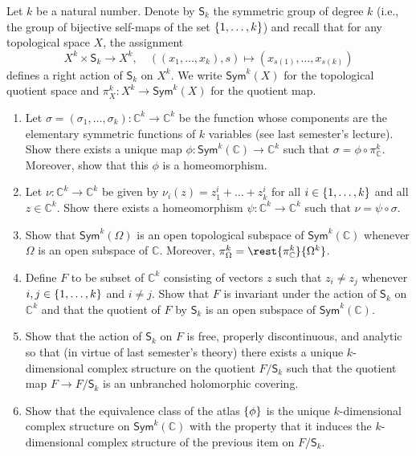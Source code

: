 \documentclass[a4paper]{amsart}
\newcommand{\C}{\mathbb{C}}
\newcommand{\SG}[1]{\mathsf{S}_{#1}}
\newcommand{\Sym}[2]{\mathsf{Sym}^{#1}(#2)}
\theoremstyle{remark}
\numberwithin{equation}{question}
\DeclarePairedDelimiter\set{\{}{\}}
\begin{document}
\begin{question}[use=false]
Let $k$ be a natural number. Denote by $\SG k$ the symmetric group of degree $k$ (i.e., the group of bijective self-maps of the set $\set{1,\dots,k}$) and recall that for any topological space $X$, the assignment
\[
X^k \times \SG k \to X^k, \quad ((x_1,\dots,x_k),s) \mapsto (x_{s(1)}, \dots, x_{s(k)})
\]
defines a right action of $\SG k$ on $X^k$. We write $\Sym kX$ for the topological quotient space and $\pi^k_X \colon X^k \to \Sym kX$ for the quotient map.
\begin{enumerate}
\item Let $\sigma = (\sigma_1,\dots,\sigma_k) \colon \C^k \to \C^k$ be the function whose components are the elementary symmetric functions of $k$ variables (see last semester's lecture). Show there exists a unique map $\phi \colon \Sym k\C \to \C^k$ such that $\sigma = \phi \circ \pi^k_\C$. Moreover, show that this $\phi$ is a homeomorphism.
\item Let $\nu \colon \C^k \to \C^k$ be given by $\nu_i(z) = z_1^i + \dots + z_k^i$ for all $i \in \set{1,\dots,k}$ and all $z \in \C^k$. Show there exists a homeomorphism $\psi \colon \C^k \to \C^k$ such that $\nu = \psi \circ \sigma$.
\item Show that $\Sym k\Omega$ is an open topological subspace of $\Sym k\C$ whenever $\Omega$ is an open subspace of $\C$. Moreover, $\pi^k_\Omega = \rest{\pi^k_\C}{\Omega^k}$.
\item Define $F$ to be subset of $\C^k$ consisting of vectors $z$ such that $z_i \ne z_j$ whenever $i,j \in \set{1,\dots,k}$ and $i \ne j$. Show that $F$ is invariant under the action of $\SG k$ on $\C^k$ and that the quotient of $F$ by $\SG k$ is an open subspace of $\Sym k\C$.
\item Show that the action of $\SG k$ on $F$ is free, properly discontinuous, and analytic so that (in virtue of last semester's theory) there exists a unique $k$-dimensional complex structure on the quotient $F/\SG k$ such that the quotient map $F \to F/\SG k$ is an unbranched holomorphic covering.
\item Show that the equivalence class of the atlas $\set\phi$ is the unique $k$-dimensional complex structure on $\Sym k\C$ with the property that it induces the $k$-dimensional complex structure of the previous item on $F/\SG k$.
\end{enumerate}
\end{question}
\end{document}
